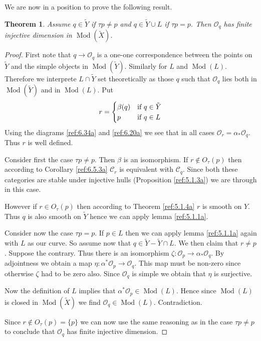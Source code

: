 \documentclass{amsproc}
\def\Cscr{{\mathcal C}}
\def\Oscr{{\mathcal O}}
\def\Qch{\operatorname {Mod}}
\def\r{\rightarrow}
\let\oldtext\text
\def\text#1{\oldtext{\upshape #1}}
\newtheorem{theorems}[lemmas]{Theorem}
\theoremstyle{definition}
\theoremstyle{remark}
\numberwithin{equation}{section}
\numberwithin{table}{section}
\numberwithin{figure}{section}
\begin{document}
We are now in a position to prove the  following result.
\begin{theorems}
\label{ref:6.6.3a}
Assume $q\in {\tilde{Y}}$ if $\tau p\neq p$ and $q\in {\tilde{Y}}\cup L$ if $\tau p= p$. Then
$\Oscr_{q}$ has finite injective dimension in $\Qch({\tilde{X}})$.
\end{theorems}
\begin{proof} First note that $q\r \Oscr_q$ is a one-one
correspondence between the points on ${\tilde{Y}}$ and the simple objects in
$\Qch({\tilde{Y}})$. Similarly for $L$ and $\Qch(L)$. Therefore we interprete $L\cap {\tilde{Y}}$
set theoretically as those $q$ such that $\Oscr_q$ lies both in $\Qch({\tilde{Y}})$ and
in $\Qch(L)$. Put
\[
r=\begin{cases}
\beta(q)&\text{if $q\in {\tilde{Y}}$}\\
p&\text{if $q\in L$}
\end{cases}
\]
Using the diagrams \eqref{ref:6.34a} and \eqref{ref:6.20a} we see
that in all cases $\Oscr_r=\alpha_\ast \Oscr_q$. Thus $r$ is well defined.

Consider first the case $\tau p\neq p$. Then $\beta$ is an isomorphism.
If $r\not\in O_\tau(p)$ then according to Corollary \ref{ref:6.5.3a}
$\Cscr_r$ is equivalent with $\Cscr_q$. Since both these categories are
stable under injective hulls (Proposition \ref{ref:5.1.3a}) we are through in
this case.

However if $r\in O_\tau(p)$ then according to Theorem \ref{ref:5.1.4a}
$r$ is smooth on $Y$. Thus $q$ is also smooth on ${\tilde{Y}}$ hence we can apply
lemma \ref{ref:5.1.1a}.

Consider now the case $\tau p=p$. If $p\in L$ then we can apply lemma
\ref{ref:5.1.1a} again with $L$ as our curve. So assume now that $q\in
{\tilde{Y}}-{\tilde{Y}}\cap L$. We then claim that $r\neq p$. Suppose the contrary. Thus
there is an isomorphism
$\zeta:\Oscr_p\r\alpha_\ast \Oscr_q$. By adjointness we obtain a map
$\eta:\alpha^\ast \Oscr_p\r \Oscr_q$. This map must be non-zero since otherwise
$\zeta$ had to be zero also.
Since $\Oscr_q$ is simple we obtain that $\eta$ is surjective. 

Now the definition of $L$ implies that $\alpha^\ast \Oscr_p\in \Qch(L)$.
Hence since $\Qch(L)$ is closed in $\Qch({\tilde{X}})$ we find $\Oscr_q\in \Qch(L)$.
Contradiction.

Since $r\not\in O_\tau(p)=\{p\}$ we can now use the same reasoning as 
in the case $\tau p\neq p$ to conclude that $\Oscr_q$ has finite injective
dimension.
\end{proof}
\end{document}
